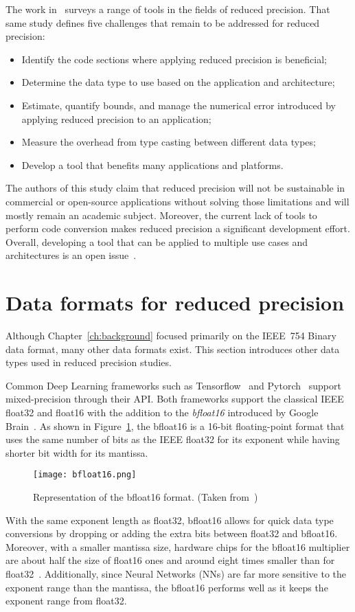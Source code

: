 The work in~\cite{Cherubin2020-tt} surveys a range of tools in the fields of reduced precision.
That same study defines five challenges that remain to be addressed for reduced precision:
\begin{itemize}
	\item[1.] Identify the code sections where applying reduced precision is beneficial;
	\item[2.] Determine the data type to use based on the application and architecture;
	\item[3.] Estimate, quantify bounds, and manage the numerical error introduced by applying reduced precision to an application;
	\item[4.] Measure the overhead from type casting between different data types;
	\item[5.] Develop a tool that benefits many applications and platforms.
\end{itemize}
The authors of this study claim that reduced precision will not be sustainable
in commercial or open-source applications without solving those limitations and
will mostly remain an academic subject.
Moreover, the current lack of tools to perform code conversion makes reduced precision
a significant development effort.
Overall, developing a tool that can be applied to multiple use cases and
architectures is an open issue~\cite{Cherubin2020-tt}.

\section{Data formats for reduced precision}
\label{sc:rp-data-format}
Although Chapter~\ref{ch:background} focused primarily on the IEEE~754 Binary data format, many other data formats exist.
This section introduces other data types used in reduced precision studies.

Common Deep Learning frameworks such as Tensorflow~\cite{tensorflow2015-whitepaper} and Pytorch~\cite{PyTorch_2019} support mixed-precision through their API.
Both frameworks support the classical IEEE float32 and float16 with the addition to the \textit{bfloat16} introduced by Google Brain~\cite{bfloat16}.
As shown in Figure~\ref{fig:bfloat16}, the bfloat16 is a 16-bit floating-point format that uses
the same number of bits as the IEEE float32 for its exponent while having shorter bit width for its mantissa.
\begin{figure}[b]
	\centering
	\texttt{[image: bfloat16.png]}
	\caption{Representation of the bfloat16 format. (Taken from~\cite{bfloat16})}
	\label{fig:bfloat16}
\end{figure}
With the same exponent length as float32, bfloat16 allows for quick data type
conversions by dropping or adding the extra bits between float32 and bfloat16.
Moreover, with a smaller mantissa size, hardware chips for the bfloat16 multiplier
are about half the size of float16 ones and around eight times smaller than for float32~\cite{bfloat16}.
Additionally, since Neural Networks (NNs) are far more sensitive to the exponent range than the mantissa,
the bfloat16 performs well as it keeps the exponent range from float32.

